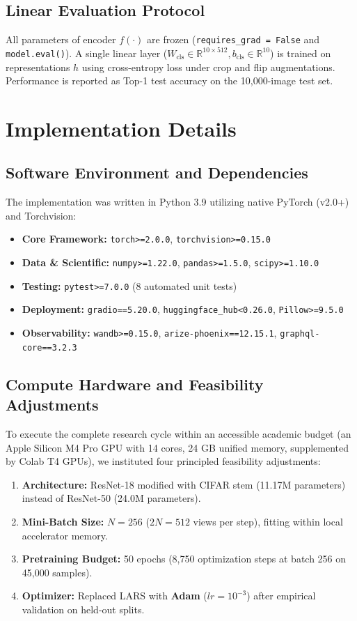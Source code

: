 \documentclass[conference]{IEEEtran}
\begin{document}
\subsection{Linear Evaluation Protocol}
All parameters of encoder $f(\cdot)$ are frozen (\texttt{requires\_grad = False} and \texttt{model.eval()}). A single linear layer ($W_{\text{cls}} \in \mathbb{R}^{10 \times 512}, b_{\text{cls}} \in \mathbb{R}^{10}$) is trained on representations $h$ using cross-entropy loss under crop and flip augmentations. Performance is reported as Top-1 test accuracy on the 10,000-image test set.

\section{Implementation Details}
\subsection{Software Environment and Dependencies}
The implementation was written in Python 3.9 utilizing native PyTorch (v2.0+) and Torchvision:
\begin{itemize}
    \item \textbf{Core Framework:} \texttt{torch>=2.0.0}, \texttt{torchvision>=0.15.0}
    \item \textbf{Data \& Scientific:} \texttt{numpy>=1.22.0}, \texttt{pandas>=1.5.0}, \texttt{scipy>=1.10.0}
    \item \textbf{Testing:} \texttt{pytest>=7.0.0} (8 automated unit tests)
    \item \textbf{Deployment:} \texttt{gradio==5.20.0}, \texttt{huggingface\_hub<0.26.0}, \texttt{Pillow>=9.5.0}
    \item \textbf{Observability:} \texttt{wandb>=0.15.0}, \texttt{arize-phoenix==12.15.1}, \texttt{graphql-core==3.2.3}
\end{itemize}

\subsection{Compute Hardware and Feasibility Adjustments}
To execute the complete research cycle within an accessible academic budget (an Apple Silicon M4 Pro GPU with 14 cores, 24 GB unified memory, supplemented by Colab T4 GPUs), we instituted four principled feasibility adjustments:
\begin{enumerate}
    \item \textbf{Architecture:} ResNet-18 modified with CIFAR stem (11.17M parameters) instead of ResNet-50 (24.0M parameters).
    \item \textbf{Mini-Batch Size:} $N = 256$ ($2N = 512$ views per step), fitting within local accelerator memory.
    \item \textbf{Pretraining Budget:} 50 epochs (8,750 optimization steps at batch 256 on 45,000 samples).
    \item \textbf{Optimizer:} Replaced LARS with \textbf{Adam} ($lr = 10^{-3}$) after empirical validation on held-out splits.
\end{enumerate}
\end{document}
